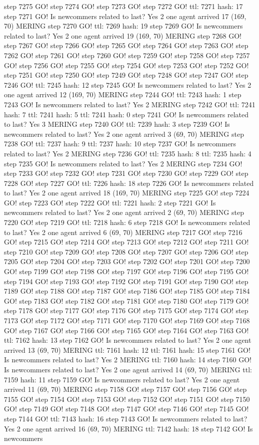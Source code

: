 step 7275 GO! step 7274 GO! step 7273 GO! step 7272 GO! ttl: 7271 hash: 17 step 7271 GO! Is newcommers related to last? Yes 2 one agent arrived 17 (169, 70) MERING step 7270 GO! ttl: 7269 hash: 19 step 7269 GO! Is newcommers related to last? Yes 2 one agent arrived 19 (169, 70) MERING step 7268 GO! step 7267 GO! step 7266 GO! step 7265 GO! step 7264 GO! step 7263 GO! step 7262 GO! step 7261 GO! step 7260 GO! step 7259 GO! step 7258 GO! step 7257 GO! step 7256 GO! step 7255 GO! step 7254 GO! step 7253 GO! step 7252 GO! step 7251 GO! step 7250 GO! step 7249 GO! step 7248 GO! step 7247 GO! step 7246 GO! ttl: 7245 hash: 12 step 7245 GO! Is newcommers related to last? Yes 2 one agent arrived 12 (169, 70) MERING step 7244 GO! ttl: 7243 hash: 1 step 7243 GO! Is newcommers related to last? Yes 2 MERING step 7242 GO! ttl: 7241 hash: 7 ttl: 7241 hash: 5 ttl: 7241 hash: 0 step 7241 GO! Is newcommers related to last? Yes 3 MERING step 7240 GO! ttl: 7239 hash: 3 step 7239 GO! Is newcommers related to last? Yes 2 one agent arrived 3 (69, 70) MERING step 7238 GO! ttl: 7237 hash: 9 ttl: 7237 hash: 10 step 7237 GO! Is newcommers related to last? Yes 2 MERING step 7236 GO! ttl: 7235 hash: 8 ttl: 7235 hash: 4 step 7235 GO! Is newcommers related to last? Yes 2 MERING step 7234 GO! step 7233 GO! step 7232 GO! step 7231 GO! step 7230 GO! step 7229 GO! step 7228 GO! step 7227 GO! ttl: 7226 hash: 18 step 7226 GO! Is newcommers related to last? Yes 2 one agent arrived 18 (169, 70) MERING step 7225 GO! step 7224 GO! step 7223 GO! step 7222 GO! ttl: 7221 hash: 2 step 7221 GO! Is newcommers related to last? Yes 2 one agent arrived 2 (69, 70) MERING step 7220 GO! step 7219 GO! ttl: 7218 hash: 6 step 7218 GO! Is newcommers related to last? Yes 2 one agent arrived 6 (69, 70) MERING step 7217 GO! step 7216 GO! step 7215 GO! step 7214 GO! step 7213 GO! step 7212 GO! step 7211 GO! step 7210 GO! step 7209 GO! step 7208 GO! step 7207 GO! step 7206 GO! step 7205 GO! step 7204 GO! step 7203 GO! step 7202 GO! step 7201 GO! step 7200 GO! step 7199 GO! step 7198 GO! step 7197 GO! step 7196 GO! step 7195 GO! step 7194 GO! step 7193 GO! step 7192 GO! step 7191 GO! step 7190 GO! step 7189 GO! step 7188 GO! step 7187 GO! step 7186 GO! step 7185 GO! step 7184 GO! step 7183 GO! step 7182 GO! step 7181 GO! step 7180 GO! step 7179 GO! step 7178 GO! step 7177 GO! step 7176 GO! step 7175 GO! step 7174 GO! step 7173 GO! step 7172 GO! step 7171 GO! step 7170 GO! step 7169 GO! step 7168 GO! step 7167 GO! step 7166 GO! step 7165 GO! step 7164 GO! step 7163 GO! ttl: 7162 hash: 13 step 7162 GO! Is newcommers related to last? Yes 2 one agent arrived 13 (69, 70) MERING ttl: 7161 hash: 12 ttl: 7161 hash: 15 step 7161 GO! Is newcommers related to last? Yes 2 MERING ttl: 7160 hash: 14 step 7160 GO! Is newcommers related to last? Yes 2 one agent arrived 14 (69, 70) MERING ttl: 7159 hash: 11 step 7159 GO! Is newcommers related to last? Yes 2 one agent arrived 11 (69, 70) MERING step 7158 GO! step 7157 GO! step 7156 GO! step 7155 GO! step 7154 GO! step 7153 GO! step 7152 GO! step 7151 GO! step 7150 GO! step 7149 GO! step 7148 GO! step 7147 GO! step 7146 GO! step 7145 GO! step 7144 GO! ttl: 7143 hash: 16 step 7143 GO! Is newcommers related to last? Yes 2 one agent arrived 16 (69, 70) MERING ttl: 7142 hash: 18 step 7142 GO! Is newcommers 